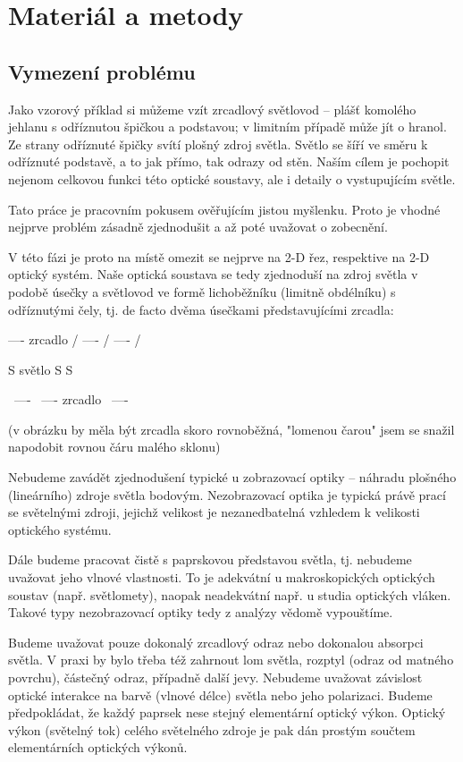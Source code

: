 \chapter{Materiál a metody}

\section{Vymezení problému}

Jako vzorový příklad si můžeme vzít zrcadlový světlovod -- plášť
komolého jehlanu s odříznutou špičkou a podstavou; v limitním případě
může jít o hranol. Ze strany odříznuté špičky svítí plošný zdroj světla.
Světlo se šíří ve směru k odříznuté podstavě, a to jak přímo, tak odrazy
od stěn. Naším cílem je pochopit nejenom celkovou funkci této optické
soustavy, ale i detaily o vystupujícím světle.

Tato práce je pracovním pokusem ověřujícím jistou myšlenku. Proto je
vhodné nejprve problém zásadně zjednodušit a až poté uvažovat o zobecnění.

V této fázi je proto na místě omezit se nejprve na 2-D řez, respektive
na 2-D optický systém. Naše optická soustava se tedy zjednoduší na zdroj
světla v podobě úsečky a světlovod ve formě lichoběžníku (limitně
obdélníku) s odříznutými čely, tj. de facto dvěma úsečkami
představujícími zrcadla:


                     ----
         zrcadlo    /
                ----
               /
          ----
         /

         S
světlo  S
         S

         \
          ----
              \
               ----
         zrcadlo   \
                    ----

(v obrázku by měla být zrcadla skoro rovnoběžná, "lomenou čarou" jsem se
snažil napodobit rovnou čáru malého sklonu)

Nebudeme zavádět zjednodušení typické u zobrazovací optiky -- náhradu
plošného (lineárního) zdroje světla bodovým. Nezobrazovací optika je
typická právě prací se světelnými zdroji, jejichž velikost je
nezanedbatelná vzhledem k velikosti optického systému.

Dále budeme pracovat čistě s paprskovou představou světla, tj. nebudeme
uvažovat jeho vlnové vlastnosti. To je adekvátní u makroskopických
optických soustav (např. světlomety), naopak neadekvátní např. u studia
optických vláken. Takové typy nezobrazovací optiky tedy z analýzy vědomě
vypouštíme.

Budeme uvažovat pouze dokonalý zrcadlový odraz nebo dokonalou absorpci
světla. V praxi by bylo třeba též zahrnout lom světla, rozptyl (odraz od
matného povrchu), částečný odraz, případně další jevy. Nebudeme uvažovat
závislost optické interakce na barvě (vlnové délce) světla nebo jeho
polarizaci. Budeme předpokládat, že každý paprsek nese stejný
elementární optický výkon. Optický výkon (světelný tok) celého
světelného zdroje je pak dán prostým součtem elementárních optických výkonů.

